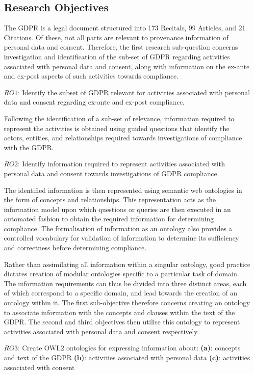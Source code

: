 \subsection{Research Objectives}
The GDPR is a legal document structured into 173 Recitals, 99 Articles, and 21 Citations. Of these, not all parts are relevant to provenance information of personal data and consent. Therefore, the first research sub-question concerns investigation and identification of the sub-set of GDPR regarding activities associated with personal data and consent, along with information on the ex-ante and ex-post aspects of such activities towards compliance.
\begin{framed}
$RO1$: Identify the subset of GDPR relevant for activities associated with personal data and consent regarding ex-ante and ex-post compliance.
\end{framed}

Following the identification of a sub-set of relevance, information required to represent the activities is obtained using guided questions that identify the actors, entities, and relationships required towards investigations of compliance with the GDPR.
\begin{framed}
$RO2$: Identify information required to represent activities associated with personal data and consent towards investigations of GDPR compliance.
\end{framed}

The identified information is then represented using semantic web ontologies in the form of concepts and relationships. This representation acts as the information model upon which questions or queries are then  executed in an automated fashion to obtain the required information for determining compliance. The formalisation of information as an ontology also provides a controlled vocabulary for validation of information to determine its sufficiency and correctness before determining compliance. 

Rather than assimilating all information within a singular ontology, good practice dictates creation of modular ontologies specific to a particular task of domain. The information requirements can thus be divided into three distinct areas, each of which correspond to a specific domain, and lead towards the creation of an ontology within it. The first sub-objective therefore concerns creating an ontology to associate information with the concepts and clauses within the text of the GDPR. The second and third objectives then utilise this ontology to represent activities associated with personal data and consent respectively.
\begin{framed}
$RO3$: Create OWL2 ontologies for expressing information about:
\newline\indent\indent\textbf{(a)}: concepts and text of the GDPR
\newline\indent\indent\textbf{(b)}: activities associated with personal data
\newline\indent\indent\textbf{(c)}: activities associated with consent
\end{framed}

